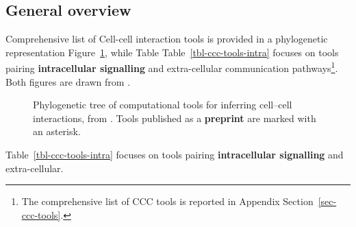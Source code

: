 \documentclass[
  letterpaper,
]{book}
\begin{document}
\subsection{General overview}\label{general-overview}

Comprehensive list of Cell-cell interaction tools is provided in a
phylogenetic representation Figure~\ref{fig-phylo-CCC}, while Table
Table~\ref{tbl-ccc-tools-intra} focuses on tools pairing
\textbf{intracellular signalling} and extra-cellular communication
pathways\footnote{The comprehensive list of CCC tools is reported in
  Appendix Section~\ref{sec-ccc-tools}.}. Both figures are drawn from
\textcite{armingol2024nrg}.

\begin{figure}


\caption{\label{fig-phylo-CCC}Phylogenetic tree of computational tools
for inferring cell--cell interactions, from
\href{https://www.nature.com/articles/s41576-023-00685-8/figures/2}{\textcite{armingol2024nrg}}.
Tools published as a \textbf{preprint} are marked with an asterisk.}

\end{figure}%

Table~\ref{tbl-ccc-tools-intra} focuses on tools pairing
\textbf{intracellular signalling} and extra-cellular.
\end{document}
